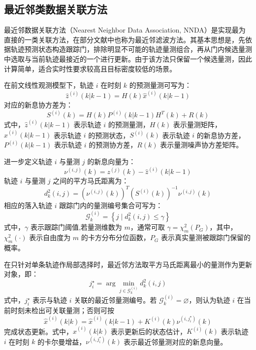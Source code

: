 \documentclass{xdupgthesis}
\begin{document}
\subsection{最近邻类数据关联方法}


最近邻数据关联方法（Nearest Neighbor Data Association, NNDA）是实现最为直接的一类关联方法，在部分文献中也称为最近邻滤波方法\cite{sea1971suboptimal}。其基本思想是，先依据轨迹预测状态构造跟踪门，排除明显不可能的轨迹量测组合，再从门内候选量测中选取与当前轨迹最接近的一个进行更新。由于该方法只保留一个候选量测，因此计算简单，适合实时性要求较高且目标密度较低的场景。

在前文线性观测模型下，轨迹 $i$ 在时刻 $k$ 的预测量测可写为：
\begin{equation}
	\hat{z}^{(i)}(k|k-1)
	=
	H(k)\hat{x}^{(i)}(k|k-1)
\end{equation}
对应的新息协方差为：
\begin{equation}
	S^{(i)}(k)
	=
	H(k)P^{(i)}(k|k-1)H^{T}(k)
	+
	R(k)
\end{equation}
式中，$\hat{z}^{(i)}(k|k-1)$ 表示轨迹 $i$ 的预测量测，$H(k)$ 表示量测矩阵，$\hat{x}^{(i)}(k|k-1)$ 表示轨迹 $i$ 的预测状态，$S^{(i)}(k)$ 表示轨迹 $i$ 的新息协方差，$P^{(i)}(k|k-1)$ 表示轨迹 $i$ 的预测协方差，$R(k)$ 表示量测噪声协方差矩阵。

进一步定义轨迹 $i$ 与量测 $j$ 的新息向量为：
\begin{equation}
	\nu^{(i,j)}(k)
	=
	z^{(j)}(k)-\hat{z}^{(i)}(k|k-1)
\end{equation}
轨迹 $i$ 与量测 $j$ 之间的平方马氏距离为：
\begin{equation}
	d_k^2(i,j)
	=
	\left(
	\nu^{(i,j)}(k)
	\right)^{T}
	\left(
	S^{(i)}(k)
	\right)^{-1}
	\nu^{(i,j)}(k)
\end{equation}
相应的落入轨迹 $i$ 跟踪门内的量测编号集合可写为：
\begin{equation}
	\mathcal{G}^{(i)}_k
	=
	\left\{
	j \mid d_k^2(i,j)\le \gamma
	\right\}
\end{equation}
式中，$\gamma$ 表示跟踪门阈值,若量测维数为 $m$，通常可取 $\gamma=\chi_m^2(P_G)$，其中，$\chi_m^2(\cdot)$ 表示自由度为 $m$ 的卡方分布分位函数，$P_G$ 表示真实量测被跟踪门保留的概率。

在只针对单条轨迹作局部选择时，最近邻方法取平方马氏距离最小的量测作为更新对象，即：
\begin{equation}
	j_i^\star
	=
	\arg\min_{j\in\mathcal{G}^{(i)}_k}
	d_k^2(i,j)
\end{equation}
式中，$j_i^\star$ 表示与轨迹 $i$ 关联的最近邻量测编号。若 $\mathcal{G}^{(i)}_k=\varnothing$，则认为轨迹 $i$ 在当前时刻未检出可关联量测；否则可按
\begin{equation}
	\hat{x}^{(i)}(k|k)
	=
	\hat{x}^{(i)}(k|k-1)
	+
	K^{(i)}(k)\nu^{(i,j_i^\star)}(k)
\end{equation}
完成状态更新。式中，$\hat{x}^{(i)}(k|k)$ 表示更新后的状态估计，$K^{(i)}(k)$ 表示轨迹 $i$ 在时刻 $k$ 的卡尔曼增益，$\nu^{(i,j_i^\star)}(k)$ 表示最近邻量测对应的新息向量。
\end{document}
